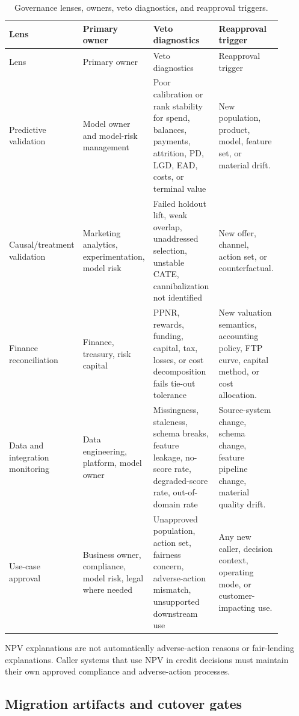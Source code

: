 \documentclass[11pt]{article}
\newcommand{\1}{\mathbf{1}}
\begin{document}
\begin{longtable}{L{0.20\linewidth}L{0.22\linewidth}L{0.28\linewidth}L{0.20\linewidth}}
\caption{Governance lenses, owners, veto diagnostics, and reapproval triggers.}
\label{tab:governance}\\
\toprule
Lens & Primary owner & Veto diagnostics & Reapproval trigger \\
\midrule
\endfirsthead
\toprule
Lens & Primary owner & Veto diagnostics & Reapproval trigger \\
\midrule
\endhead
Predictive validation
  & Model owner and model-risk management
  & Poor calibration or rank stability for spend, balances, payments,
    attrition, PD, LGD, EAD, costs, or terminal value
  & New population, product, model, feature set, or material drift. \\
Causal/treatment validation
  & Marketing analytics, experimentation, model risk
  & Failed holdout lift, weak overlap, unaddressed selection, unstable CATE,
    cannibalization not identified
  & New offer, channel, action set, or counterfactual. \\
Finance reconciliation
  & Finance, treasury, risk capital
  & PPNR, rewards, funding, capital, tax, losses, or cost decomposition fails
    tie-out tolerance
  & New valuation semantics, accounting policy, FTP curve, capital method, or
    cost allocation. \\
Data and integration monitoring
  & Data engineering, platform, model owner
  & Missingness, staleness, schema breaks, feature leakage, no-score rate,
    degraded-score rate, out-of-domain rate
  & Source-system change, schema change, feature pipeline change, material
    quality drift. \\
Use-case approval
  & Business owner, compliance, model risk, legal where needed
  & Unapproved population, action set, fairness concern, adverse-action
    mismatch, unsupported downstream use
  & Any new caller, decision context, operating mode, or customer-impacting
    use. \\
\bottomrule
\end{longtable}

NPV explanations are not automatically adverse-action reasons or fair-lending
explanations. Caller systems that use NPV in credit decisions must maintain
their own approved compliance and adverse-action processes.

\subsection{Migration artifacts and cutover gates}
\label{subsec:migration-artifacts}
\end{document}
